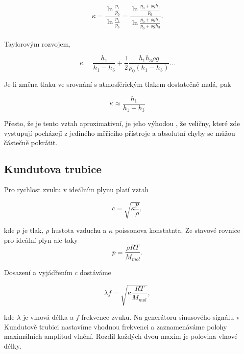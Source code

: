 \documentclass[a4paper,11pt]{article}
\begin{document}
\begin{equation}
  \kappa = \frac{\ln{\frac{p_1}{p_0}}}{\ln{\frac{p_1}{p_3}}} = \frac{\ln{\frac{p_0 + \rho g h_1}{p_0}}}{\ln{\frac{p_0 + \rho g h_1}{p_0 + \rho g h_3}}}.
\end{equation} \\

Taylorovým rozvojem,

\begin{equation}
  \kappa = \frac{h_1}{h_1 - h_3} + \frac{1}{2} \frac{h_1 h_3 \rho g}{p_0 (h_1 - h_3)} \ldots
\end{equation}

Je-li změna tlaku ve srovnání s atmosférickým tlakem dostatečně malá, pak

\begin{equation}
\kappa \approx \frac{h_1}{h_1 - h_3}
\end{equation}

Přesto, že je tento vztah aproximativní,
je jeho výhodou , že veličny, které zde vystupují pocházejǐ z jediného měřícího přístroje a absolutní chyby se 
můžou částečně pokrátit.

\subsection{Kundutova trubice}

Pro rychlost zvuku v ideálním plynu platí vztah

\begin{equation}
c = \sqrt{\kappa \frac{p}{\rho}},
\end{equation}

kde $p$ je tlak, $\rho$ hustota vzduchu a  $\kappa$ poissonova konstatnta. Ze stavové rovnice pro ideální plyn ale taky
\begin{equation}
  p = \frac{\rho R T}{ M_{mol}}.
\end{equation}

Dosazení a vyjádřením $c$ dostáváme

 \begin{equation}
   \lambda f = \sqrt{\kappa \frac{RT}{M_{mol}}},
\end{equation}

kde $\lambda$ je vlnová délka a $f$ frekvence zvuku. 
Na generátoru sinusového signálu v Kundutově trubici nastavíme vhodnou frekvenci a zaznamenáváme polohy maximálních amplitud vlnění.
Rozdíl každých dvou maxim je polovina vlnové délky.

\newpage
\end{document}
